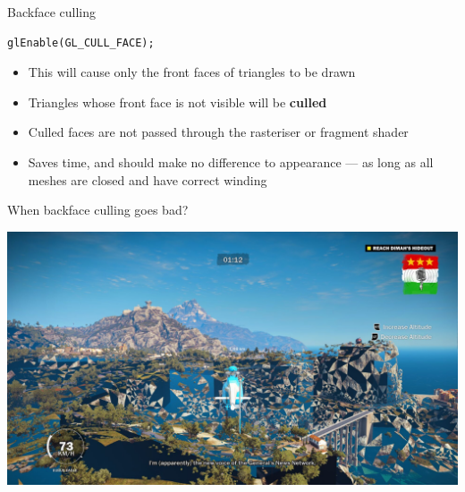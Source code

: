 \begin{frame}[fragile]{Backface culling}
	\pause
	\begin{lstlisting}
glEnable(GL_CULL_FACE);
	\end{lstlisting}
	\begin{itemize}
		\pause\item This will cause only the front faces of triangles to be drawn
		\pause\item Triangles whose front face is not visible will be \textbf{culled}
		\pause\item Culled faces are not passed through the rasteriser or fragment shader
		\pause\item Saves time, and should make no difference to appearance ---
			as long as all meshes are closed and have correct winding
	\end{itemize}
\end{frame}

\begin{frame}[fragile]{When backface culling goes bad?}
	\begin{center}
		\includegraphics[width=\textwidth]{missing_triangles}
	\end{center}
\end{frame}



